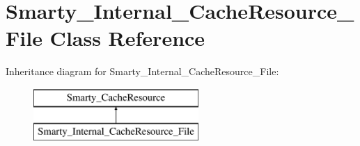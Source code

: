 \hypertarget{class_smarty___internal___cache_resource___file}{}\section{Smarty\+\_\+\+Internal\+\_\+\+Cache\+Resource\+\_\+\+File Class Reference}
\label{class_smarty___internal___cache_resource___file}
Inheritance diagram for Smarty\+\_\+\+Internal\+\_\+\+Cache\+Resource\+\_\+\+File\+:\begin{figure}[H]
\begin{center}
\leavevmode
\includegraphics[height=2.000000cm]{class_smarty___internal___cache_resource___file}
\end{center}
\end{figure}
